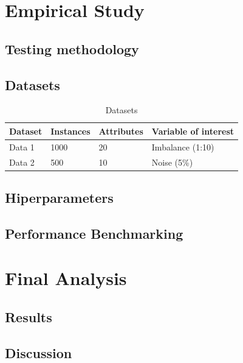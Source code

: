 \documentclass[12pt,a4paper]{article}
\begin{document}
\section{Empirical Study}
\subsection{Testing methodology}

\subsection{Datasets}
\begin{table}[h!]
\centering
\begin{tabular}{@{}llll@{}}
\toprule
Dataset & Instances & Attributes & Variable of interest \\ \midrule
Data 1  & 1000       & 20        & Imbalance (1:10)            \\
Data 2  & 500        & 10        & Noise (5\%)                 \\ \bottomrule
\end{tabular}
\caption{Datasets}
\end{table}

\subsection{Hiperparameters}

\subsection{Performance Benchmarking}

\section{Final Analysis}
\subsection{Results}

\subsection{Discussion}
\end{document}
